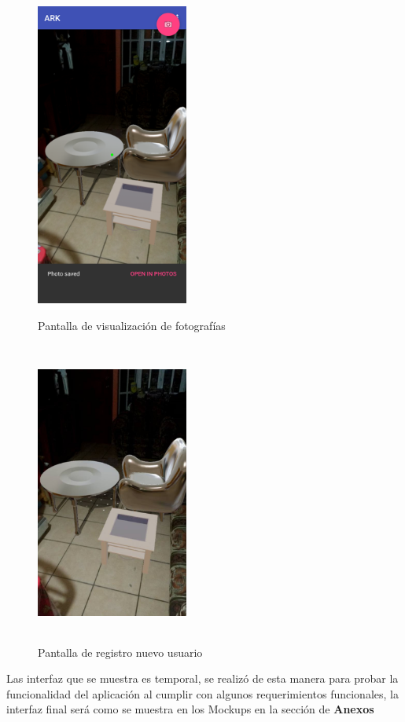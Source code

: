 \begin{figure}[H]
	\begin{minipage}{0.48\textwidth}
		\centering
		\includegraphics[width=5cm,height=10cm]{imagenes/iteraciones/save1.png}
		\caption{Pantalla de visualización de fotografías}
		\label{fig:save}
	\end{minipage}\hfill
	\begin{minipage}{0.48\textwidth}
		\centering
		\includegraphics[width=5cm,height=10cm]{imagenes/iteraciones/foto.jpg}
		\caption{Pantalla de registro nuevo usuario}
		\label{fig:foto}
	\end{minipage}\hfill
\end{figure}
Las interfaz que se muestra es temporal, se realizó de esta manera para probar la funcionalidad del aplicación al cumplir con algunos requerimientos funcionales, la interfaz final será como se muestra en los Mockups en la sección de \textbf{Anexos}